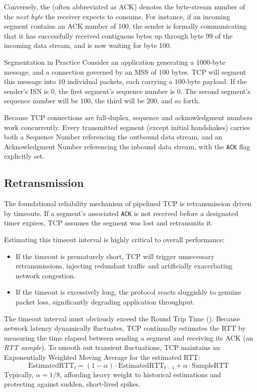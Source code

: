 Conversely, the  (often abbreviated as ACK) denotes the byte-stream number of the \emph{next byte} the receiver expects to consume. For instance, if an incoming segment contains an ACK number of 100, the sender is formally communicating that it has successfully received contiguous bytes up through byte 99 of the incoming data stream, and is now waiting for byte 100.

\begin{example}{Segmentation in Practice}
Consider an application generating a \( 1000 \)-byte message, and a connection governed by an MSS of \( 100 \) bytes. TCP will segment this message into \( 10 \) individual packets, each carrying a \( 100 \)-byte payload. 
If the sender's ISN is \( 0 \), the first segment's sequence number is \( 0 \). The second segment's sequence number will be \( 100 \), the third will be \( 200 \), and so forth.
\end{example}

Because TCP connections are full-duplex, sequence and acknowledgment numbers work concurrently. Every transmitted segment (except initial handshakes) carries both a Sequence Number referencing the outbound data stream, and an Acknowledgment Number referencing the inbound data stream, with the \texttt{ACK} flag explicitly set.

\subsection{Retransmission}
The foundational reliability mechanism of pipelined TCP is retransmission driven by timeouts. If a segment's associated \texttt{ACK} is not received before a designated timer expires, TCP assumes the segment was lost and retransmits it.

Estimating this timeout interval is highly critical to overall performance:
\begin{itemize}
    \item If the timeout is prematurely short, TCP will trigger unnecessary retransmissions, injecting redundant traffic and artificially exacerbating network congestion.
    \item If the timeout is excessively long, the protocol reacts sluggishly to genuine packet loss, significantly degrading application throughput.
\end{itemize}

The timeout interval must obviously exceed the Round Trip Time (). Because network latency dynamically fluctuates, TCP continually estimates the RTT by measuring the time elapsed between sending a segment and receiving its ACK (an \emph{RTT sample}). 
To smooth out transient fluctuations, TCP maintains an Exponentially Weighted Moving Average for the estimated RTT:
\[
\text{EstimatedRTT}_{t} = (1 - \alpha) \cdot \text{EstimatedRTT}_{t-1} + \alpha \cdot \text{SampleRTT}
\]
Typically, \( \alpha = 1/8 \), affording heavy weight to historical estimations and protecting against sudden, short-lived spikes.

